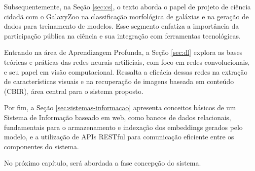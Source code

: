 Subsequentemente, na Seção \ref{sec:cs}, o texto aborda o papel de projeto de ciência cidadã com o GalaxyZoo na classificação morfológica de galáxias e na geração de dados para treinamento de modelos. Esse segmento enfatiza a importância da participação pública na ciência e sua integração com ferramentas tecnológicas.

Entrando na área de Aprendizagem Profunda, a Seção \ref{sec:dl} explora as bases teóricas e práticas das redes neurais artificiais, com foco em redes convolucionais, e seu papel em visão computacional. Ressalta a eficácia dessas redes na extração de características visuais e na recuperação de imagens baseada em conteúdo (CBIR), área central para o sistema proposto.

Por fim, a Seção \ref{sec:sistemas-informacao} apresenta conceitos básicos de um Sistema de Informação baseado em web, como bancos de dados relacionais, fundamentais para o armazenamento e indexação dos embeddings gerados pelo modelo, e a utilização de APIs RESTful para comunicação eficiente entre os componentes do sistema.

No próximo capítulo, será abordada a fase concepção do sistema.

\chaptersep
